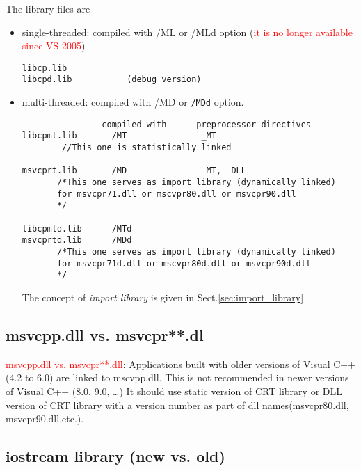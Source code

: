 The library files are 
\begin{itemize}
  
  \item single-threaded: compiled with /ML or /MLd option (\textcolor{red}{it is
  no longer available since VS 2005})

\begin{verbatim}
libcp.lib
libcpd.lib           (debug version)

\end{verbatim}  
  
  
  \item multi-threaded: compiled with /MD or \verb!/MDd! option.
\begin{verbatim}
                compiled with      preprocessor directives
libcpmt.lib       /MT               _MT
        //This one is statistically linked
        
msvcprt.lib       /MD               _MT, _DLL
       /*This one serves as import library (dynamically linked)
       for msvcpr71.dll or mscvpr80.dll or msvcpr90.dll
       */ 

libcpmtd.lib      /MTd
msvcprtd.lib      /MDd
       /*This one serves as import library (dynamically linked)
       for msvcpr71d.dll or mscvpr80d.dll or msvcpr90d.dll
       */
\end{verbatim}
The concept of {\it import library} is given in Sect.\ref{sec:import_library}

\end{itemize}

\subsection{msvcpp.dll vs. msvcpr**.dl}
\label{sec:msvcpp.dll}

\textcolor{red}{msvcpp.dll vs. msvcpr**.dll}: Applications built with older
versions of Visual C++ (4.2 to 6.0) are linked to mscvpp.dll. This is not
recommended in newer versions of Visual C++ (8.0, 9.0, \ldots) It should use
static version of CRT library or DLL version of CRT library with a version
number as part of dll names(msvcpr80.dll, msvcpr90.dll,etc.).

\subsection{iostream library (new vs. old)}
\label{sec:iostream_library}

